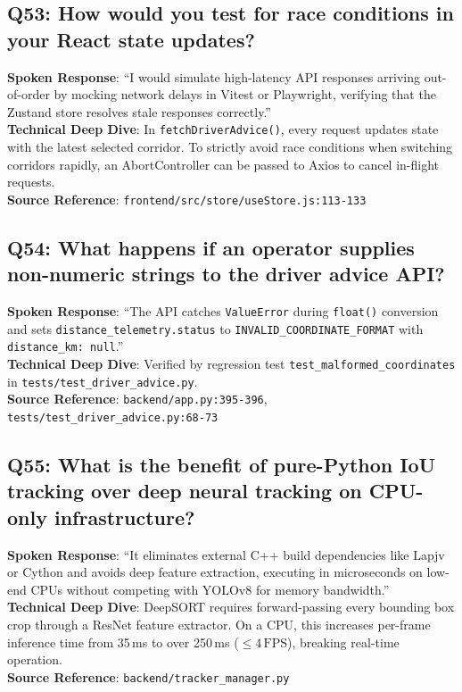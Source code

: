 \documentclass[11pt,a4paper,oneside]{report}
\begin{document}
\subsection*{Q53: How would you test for race conditions in your React state updates?}
\begin{interviewbox}
\textbf{Spoken Response}: ``I would simulate high-latency API responses arriving out-of-order by mocking network delays in Vitest or Playwright, verifying that the Zustand store resolves stale responses correctly.''\\
\textbf{Technical Deep Dive}: In \texttt{fetchDriverAdvice()}, every request updates state with the latest selected corridor. To strictly avoid race conditions when switching corridors rapidly, an AbortController can be passed to Axios to cancel in-flight requests.\\
\textbf{Source Reference}: \texttt{frontend/src/store/useStore.js:113-133}
\end{interviewbox}

\subsection*{Q54: What happens if an operator supplies non-numeric strings to the driver advice API?}
\begin{interviewbox}
\textbf{Spoken Response}: ``The API catches \texttt{ValueError} during \texttt{float()} conversion and sets \texttt{distance\_telemetry.status} to \texttt{INVALID\_COORDINATE\_FORMAT} with \texttt{distance\_km: null}.''\\
\textbf{Technical Deep Dive}: Verified by regression test \texttt{test\_malformed\_coordinates} in \texttt{tests/test\_driver\_advice.py}.\\
\textbf{Source Reference}: \texttt{backend/app.py:395-396}, \texttt{tests/test\_driver\_advice.py:68-73}
\end{interviewbox}

\subsection*{Q55: What is the benefit of pure-Python IoU tracking over deep neural tracking on CPU-only infrastructure?}
\begin{interviewbox}
\textbf{Spoken Response}: ``It eliminates external C++ build dependencies like Lapjv or Cython and avoids deep feature extraction, executing in microseconds on low-end CPUs without competing with YOLOv8 for memory bandwidth.''\\
\textbf{Technical Deep Dive}: DeepSORT requires forward-passing every bounding box crop through a ResNet feature extractor. On a CPU, this increases per-frame inference time from 35\,ms to over 250\,ms ($\le 4\,\text{FPS}$), breaking real-time operation.\\
\textbf{Source Reference}: \texttt{backend/tracker\_manager.py}
\end{interviewbox}
\end{document}

